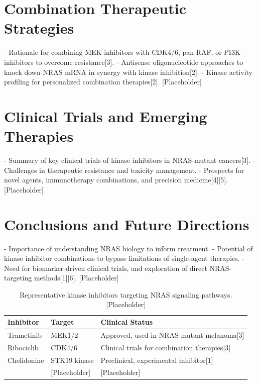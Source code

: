 \documentclass[12pt]{article}
\begin{document}
\section*{Combination Therapeutic Strategies}
- Rationale for combining MEK inhibitors with CDK4/6, pan-RAF, or PI3K inhibitors to overcome resistance[3].
- Antisense oligonucleotide approaches to knock down NRAS mRNA in synergy with kinase inhibition[2].
- Kinase activity profiling for personalized combination therapies[2].
[Placeholder]

\section*{Clinical Trials and Emerging Therapies}
- Summary of key clinical trials of kinase inhibitors in NRAS-mutant cancers[3].
- Challenges in therapeutic resistance and toxicity management.
- Prospects for novel agents, immunotherapy combinations, and precision medicine[4][5].
[Placeholder]

\section*{Conclusions and Future Directions}
- Importance of understanding NRAS biology to inform treatment.
- Potential of kinase inhibitor combinations to bypass limitations of single-agent therapies.
- Need for biomarker-driven clinical trials, and exploration of direct NRAS-targeting methods[1][6].
[Placeholder]

\begin{table}[h]
\centering
\begin{tabular}{lll}
\hline
Inhibitor & Target & Clinical Status \\
\hline
Trametinib & MEK1/2 & Approved, used in NRAS-mutant melanoma[3] \\
Ribociclib & CDK4/6 & Clinical trials for combination therapies[3] \\
Chelidonine & STK19 kinase & Preclinical, experimental inhibitor[1] \\
[Placeholder] & [Placeholder] & [Placeholder] \\
\hline
\end{tabular}
\caption{Representative kinase inhibitors targeting NRAS signaling pathways. [Placeholder]}
\end{table}



\end{document}
